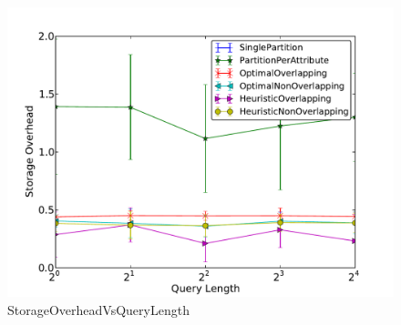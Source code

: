 \begin{figure}[ht]
\centerline{\includegraphics[width=0.9\columnwidth]{figures/StorageOverheadVsQueryLength.pdf}}
\caption{StorageOverheadVsQueryLength}
\end{figure}







